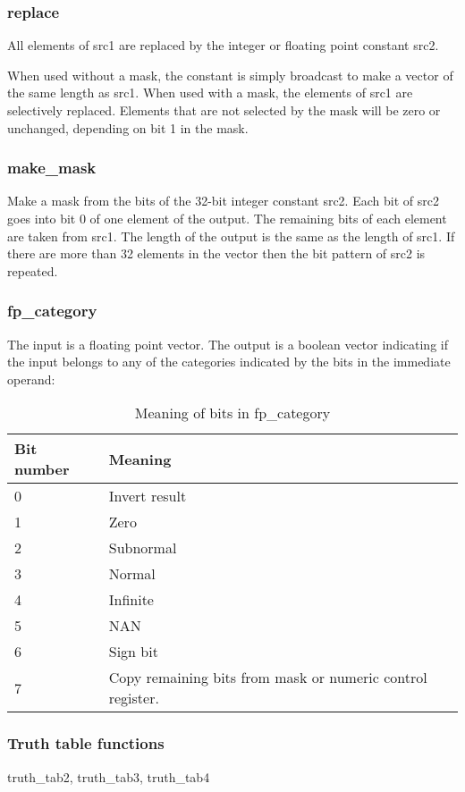\documentclass[forwardcom.tex]{subfiles}
\begin{document}
\subsubsection{replace}
All elements of src1 are replaced by the integer or floating point constant src2.
\vspace{2mm}

When used without a mask, the constant is simply broadcast to make a vector of the same length as src1. When used with a mask, the elements of src1 are selectively replaced. Elements that are not selected by the mask will be zero or unchanged, depending on bit 1 in the mask.

\subsubsection{make\_mask}
Make a mask from the bits of the 32-bit integer constant src2. Each bit of src2 goes into bit 0 of one element of the output. The remaining bits of each element are taken from src1. The length of the output is the same as the length of src1. If there are more than 32 elements in the vector then the bit pattern of src2 is repeated.


\subsubsection{fp\_category}
The input is a floating point vector. The output is a boolean vector indicating if the input belongs to any of the categories indicated by the bits in the immediate operand:

\begin{longtable} {|p{20mm}|p{90mm}|}
\caption{Meaning of bits in fp\_category} 
\label{table:fpCategoryInstructionBits} \\
\endfirsthead
\endhead
\hline
\bfseries Bit number & \bfseries Meaning  \\
\hline
0 & Invert result \\
1 & Zero \\
2 & Subnormal  \\
3 & Normal \\
4 & Infinite  \\
5 & NAN \\
6 & Sign bit  \\
7 & Copy remaining bits from mask or numeric control register.  \\
\hline
\end{longtable}
  

\subsubsection{Truth table functions} \label{truthTableFunctions}
truth\_tab2, truth\_tab3, truth\_tab4
\vspace{2mm}
\end{document}
